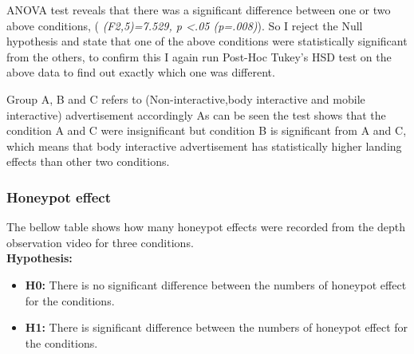 ANOVA test reveals that there was a significant difference between one or two above conditions, ( \emph{(F2,5)=7.529, p <.05 (p=.008)}). So I reject the Null hypothesis and state that one of the above conditions were statistically significant from the others, to confirm this I again run Post-Hoc Tukey’s HSD test on the above data to find out exactly which one was different.


\begin{table}[H]
\caption{Post-Hoc Tukey’s HSD results}
\label{tab:landing-non-posthoctukey}
\centering
{}
\end{table}


Group A, B and C refers to (Non-interactive,body interactive and mobile interactive) advertisement accordingly As can be seen the test shows that the condition A and C were insignificant but condition B is significant from A and C, which means that body interactive advertisement has statistically higher landing effects than other two conditions.


\subsubsection {Honeypot effect}
The bellow table shows how many honeypot effects were recorded from the depth observation video for three conditions.\\

\textbf{Hypothesis: }
\begin{itemize}
\item \textbf{H0:} There is no significant difference between the numbers of honeypot effect for the conditions.
\item \textbf{H1:} There is significant difference between the numbers of honeypot effect for the conditions.
\end{itemize}


